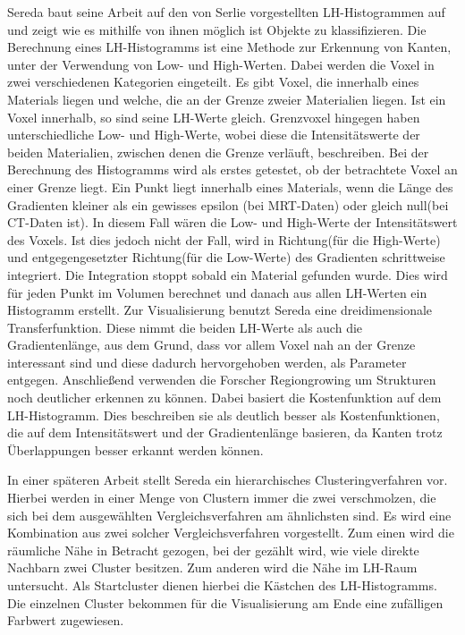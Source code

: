 Sereda baut seine Arbeit \cite{sereda2006visualization} auf den von Serlie \cite{serlie2003computed} vorgestellten LH-Histogrammen auf und zeigt wie es mithilfe von ihnen möglich ist Objekte zu klassifizieren.
Die Berechnung eines LH-Histogramms ist eine Methode zur Erkennung von Kanten, unter der Verwendung von Low- und High-Werten. Dabei werden die Voxel in zwei verschiedenen Kategorien eingeteilt.
Es gibt Voxel, die  innerhalb eines Materials liegen und welche, die  an der Grenze zweier Materialien liegen. Ist ein Voxel innerhalb, so sind seine LH-Werte gleich. Grenzvoxel hingegen haben unterschiedliche Low- und High-Werte, wobei diese die Intensitätswerte der beiden Materialien, zwischen denen die Grenze verläuft, beschreiben. 
\newline
Bei der Berechnung des Histogramms wird als erstes getestet, ob der betrachtete Voxel an einer Grenze liegt. Ein Punkt liegt innerhalb eines Materials, wenn  die Länge des Gradienten kleiner als ein gewisses epsilon (bei MRT-Daten) oder gleich null(bei CT-Daten ist). In diesem Fall wären die Low- und High-Werte der Intensitätswert des Voxels. Ist dies jedoch nicht der Fall, wird in Richtung(für die High-Werte) und entgegengesetzter Richtung(für die Low-Werte) des Gradienten schrittweise integriert. Die Integration stoppt sobald ein Material gefunden wurde. Dies wird für jeden Punkt im Volumen berechnet und danach aus allen LH-Werten ein Histogramm erstellt.
Zur Visualisierung benutzt Sereda eine dreidimensionale Transferfunktion. Diese nimmt die beiden LH-Werte als auch die Gradientenlänge, aus dem Grund, dass vor allem Voxel nah an der Grenze interessant sind und diese dadurch hervorgehoben werden, als Parameter entgegen.
Anschließend verwenden die Forscher Regiongrowing um Strukturen noch deutlicher erkennen zu können. Dabei basiert die Kostenfunktion auf dem LH-Histogramm. Dies beschreiben sie als deutlich besser als Kostenfunktionen, die auf dem Intensitätswert und der Gradientenlänge basieren, da Kanten trotz Überlappungen besser erkannt werden können.


In einer späteren Arbeit \cite{sereda2006automating} stellt Sereda ein hierarchisches Clusteringverfahren vor. Hierbei werden in einer Menge von Clustern immer die zwei verschmolzen, die sich bei dem ausgewählten Vergleichsverfahren am ähnlichsten sind. Es wird eine Kombination aus zwei solcher Vergleichsverfahren vorgestellt.
Zum einen wird die räumliche Nähe in Betracht gezogen, bei der gezählt wird, wie viele direkte Nachbarn zwei Cluster besitzen. Zum anderen wird die Nähe im LH-Raum untersucht.
Als Startcluster dienen hierbei die Kästchen des LH-Histogramms. Die einzelnen Cluster bekommen für die Visualisierung am Ende eine zufälligen Farbwert zugewiesen. 


